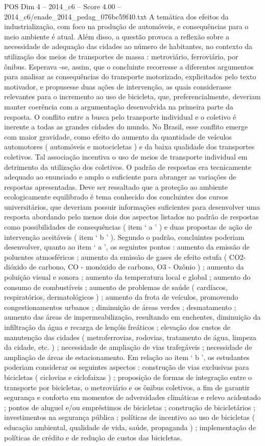 \begin{textsample}{POS Dim 4 – 2014\_c6 – Score 4.00 – 2014\_c6/enade\_2014\_pedag\_076bc59f40.txt}
A temática dos efeitos da industrialização, com foco na produção de automóveis, e consequências para o meio ambiente é atual.
Além disso, a questão provoca a reflexão sobre a necessidade de adequação das cidades ao número de habitantes, no contexto da utilização dos meios de transportes de massa : metroviário, ferroviário, por ônibus.
Esperava -se, assim, que o concluinte recorresse a diferentes argumentos para analisar as consequências do transporte motorizado, explicitados pelo texto motivador, e propusesse duas ações de intervenção, as quais considerasse relevantes para o incremento ao uso de bicicleta, que, preferencialmente, deveriam manter coerência com a argumentação desenvolvida na primeira parte da resposta.
O conflito entre a busca pelo transporte individual e o coletivo é inerente a todas as grandes cidades do mundo.
No Brasil, esse conflito emerge com maior gravidade, como efeito do aumento da quantidade de veículos automotores ( automóveis e motocicletas ) e da baixa qualidade dos transportes coletivos.
Tal associação incentiva o uso de meios de transporte individual em detrimento da utilização dos coletivos.
O padrão de respostas era tecnicamente adequado ao enunciado e amplo o suficiente para abranger as variações de respostas apresentadas.
Deve ser ressaltado que a proteção ao ambiente ecologicamente equilibrado é tema conhecido dos concluintes dos cursos universitários, que deveriam possuir informações suficientes para desenvolver uma resposta abordando pelo menos dois dos aspectos listados no padrão de respostas como possibilidades de consequências ( item ‘ a ’ ) e duas propostas de ação de intervenção aceitáveis ( item ‘ b ’ ).
Segundo o padrão, concluintes poderiam desenvolver, quanto ao item ‘ a ’, os seguintes pontos : aumento da emissão de poluentes atmosféricos ; aumento da emissão de gases de efeito estufa ( CO2- dióxido de carbono, CO - monóxido de carbono, O3 - Ozônio ) ; aumento da poluição visual e sonora ; aumento da temperatura local e global ; aumento do consumo de combustíveis ; aumento de problemas de saúde ( cardíacos, respiratórios, dermatológicos ) ; aumento da frota de veículos, promovendo congestionamentos urbanos ; diminuição de áreas verdes ; desmatamento ; aumento das áreas de impermeabilização, resultando em enchentes, diminuição da infiltração da água e recarga de lençóis freáticos ; elevação dos custos de manutenção das cidades ( metroferrovias, rodovias, tratamento de água, limpeza da cidade, etc. ) ; necessidade de ampliação de vias trafegáveis ; necessidade de ampliação de áreas de estacionamento.
Em relação ao item ‘ b ’, os estudantes poderiam considerar os seguintes aspectos : construção de vias exclusivas para bicicletas ( ciclovias e ciclofaixas ) ; proposição de formas de integração entre o transporte por bicicletas, o metroviário e os ônibus coletivos, a fim de garantir segurança e conforto em momentos de adversidades climáticas e relevo acidentado ; pontos de aluguel e/ou empréstimos de bicicletas ; construção de bicicletários ; investimentos na segurança pública ; políticas de incentivo ao uso de bicicletas ( educação ambiental, qualidade de vida, saúde, propaganda ) ; implementação de políticas de crédito e de redução de custos das bicicletas.

\end{textsample}
